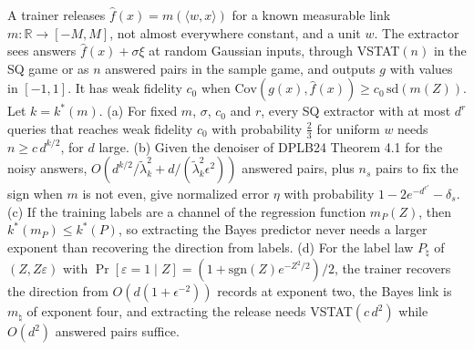 \begin{theorem}
A trainer releases $\hat f(x)=m(\langle w,x\rangle)$ for a known measurable link
$m:\mathbb R\to[-M,M]$, not almost everywhere constant, and a unit $w$. The extractor
sees answers $\hat f(x)+\sigma\xi$ at random Gaussian inputs, through VSTAT$(n)$ in the
SQ game or as $n$ answered pairs in the sample game, and outputs $g$ with values in
$[-1,1]$. It has weak fidelity $c_0$ when
$\mathrm{Cov}(g(x),\hat f(x))\ge c_0\,\mathrm{sd}(m(Z))$. Let $k=k^*(m)$. (a) For fixed
$m$, $\sigma$, $c_0$ and $r$, every SQ extractor with at most $d^r$ queries that reaches
weak fidelity $c_0$ with probability $\frac23$ for uniform $w$ needs $n\ge c\,d^{k/2}$,
for $d$ large. (b) Given the denoiser of DPLB24 Theorem 4.1 for the noisy answers,
$O(d^{k/2}/\tilde\lambda_k^2+d/(\tilde\lambda_k^2\epsilon^2))$ answered pairs, plus
$n_s$ pairs to fix the sign when $m$ is not even, give normalized error $\eta$ with
probability $1-2e^{-d^{c'}}-\delta_s$. (c) If the training labels are a channel of the
regression function $m_P(Z)$, then $k^*(m_P)\le k^*(P)$, so extracting the Bayes
predictor never needs a larger exponent than recovering the direction from labels. (d)
For the label law $P_\natural$ of $(Z,Z\varepsilon)$ with
$\Pr[\varepsilon=1\mid Z]=(1+\mathrm{sgn}(Z)e^{-Z^2/2})/2$, the trainer recovers the
direction from $O(d(1+\epsilon^{-2}))$ records at exponent two, the Bayes link is
$m_\natural$ of exponent four, and extracting the release needs VSTAT$(c\,d^2)$ while
$O(d^2)$ answered pairs suffice.
\end{theorem}
